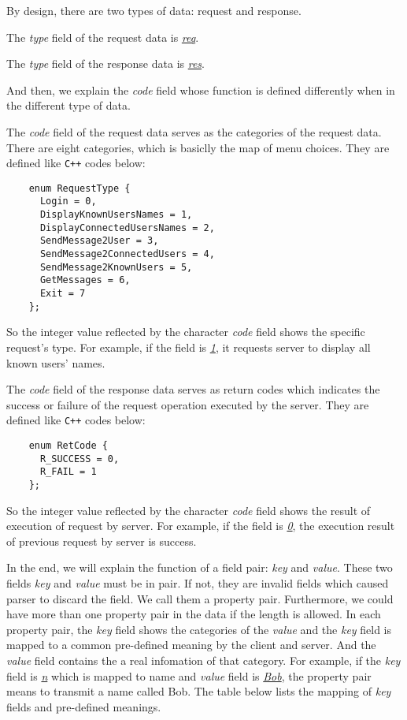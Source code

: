 \documentclass[a4paper]{report}
\begin{document}
By design, there are two types of data: request and response.
\begin{description}[labelindent=1em]
  \item[Request:] The \textit{type} field of the request data is \underline{\textit{req}}.
  \item[Response:] The \textit{type} field of the response data is \underline{\textit{res}}.
\end{description}

\noindent And then, we explain the \textit{code} field whose function is defined differently when in the different type of data.
\begin{description}[labelindent=1em]
  \item[Request:] The \textit{code} field of the request data serves as the categories of the request data. There are eight categories, which is basiclly the map of menu choices. They are defined like \lstinline{C++} codes below:
  \begin{lstlisting}
    enum RequestType {
      Login = 0,
      DisplayKnownUsersNames = 1,
      DisplayConnectedUsersNames = 2,
      SendMessage2User = 3,
      SendMessage2ConnectedUsers = 4,
      SendMessage2KnownUsers = 5,
      GetMessages = 6,
      Exit = 7
    };
  \end{lstlisting}
  So the integer value reflected by the character \textit{code} field shows the specific request's type. For example, if the field is \underline{\textit{1}}, it requests server to display all known users' names.
  \item[Response:] The \textit{code} field of the response data serves as return codes which indicates the success or failure of the request operation executed by the server. They are defined like \lstinline{C++} codes below:
  \begin{lstlisting}
    enum RetCode {
      R_SUCCESS = 0,
      R_FAIL = 1
    };
  \end{lstlisting}
  So the integer value reflected by the character \textit{code} field shows the result of execution of request by server. For example, if the field is \underline{\textit{0}}, the execution result of previous request by server is success.
\end{description}

\noindent In the end, we will explain the function of a field pair: \textit{key} and \textit{value}. These two fields \textit{key} and \textit{value} must be in pair. If not, they are invalid fields which caused parser to discard the field. We call them a property pair. Furthermore, we could have more than one property pair in the data if the length is allowed. In each property pair, the \textit{key} field shows the categories of the \textit{value} and the \textit{key} field is mapped to a common pre-defined meaning by the client and server. And the \textit{value} field contains the a real infomation of that category. For example, if the \textit{key} field is \underline{\textit{n}} which is mapped to name and \textit{value} field is \underline{\textit{Bob}}, the property pair means to transmit a name called Bob. The table below lists the mapping of \textit{key} fields and pre-defined meanings.
\end{document}
